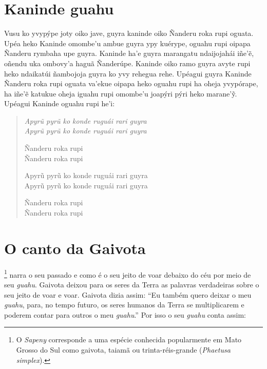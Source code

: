 \chapter{Kaninde guahu}

 Vusu ko yvypýpe joty oiko jave, guyra kaninde oiko Ñanderu roka
rupi oguata. Upéa heko Kaninde omombe'u ambue guyra ypy kuérype, oguahu
rupi oipapa Ñanderu rymbaha upe guyra. Kaninde ha'e guyra marangatu
ndaijojahái iñe'ẽ, oñendu uka ombovy'a haguã Ñanderúpe. Kaninde oiko
ramo guyra avyte rupi heko ndaikatúi ñambojoja guyra ko yvy rehegua
rehe. Upéagui guyra Kaninde Ñanderu roka rupi oguata va'ekue oipapa heko
oguahu rupi ha oheja yvypórape, ha iñe'ẽ katukue oheja iguahu rupi
omombe'u joapýri pýri heko marane'ỹ. Upéagui Kaninde oguahu rupi he'i:

\begin{verse}
\itshape
Apyrũ pyrũ ko konde ruguái rari guyra\\
Apyrũ pyrũ ko konde ruguái rari guyra

Ñanderu roka rupi\\
Ñanderu roka rupi

Apyrũ pyrũ ko konde ruguái rari guyra\\
Apyrũ pyrũ ko konde ruguái rari guyra

Ñanderu roka rupi\\
Ñanderu roka rupi
\end{verse}

\chapter{O canto da Gaivota}

\footnote{O \emph{Sapeny} corresponde a uma espécie conhecida
  popularmente em Mato Grosso do Sul como gaivota, taiamã ou
  trinta-réis-grande (\emph{Phaetusa simplex}).} narra o seu passado e
como é o seu jeito de voar debaixo do céu por meio de seu \emph{guahu}.
Gaivota deixou para os seres da Terra as palavras verdadeiras sobre o
seu jeito de voar e voar. Gaivota dizia assim: ``Eu também quero deixar
o meu \emph{guahu}, para, no tempo futuro, os seres humanos da Terra se
multiplicarem e poderem contar para outros o meu \emph{guahu}.'' Por
isso o seu \emph{guahu} conta assim:

